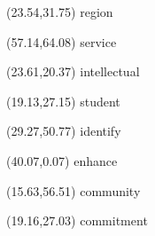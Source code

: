 \documentclass[11pt]{letter} %
\begin{document}
\begin{textblock}{0}(23.54,31.75) \small{region} \end{textblock}
\begin{textblock}{0}(57.14,64.08) \scriptsize{service} \end{textblock}
\begin{textblock}{0}(23.61,20.37) \tiny{intellectual} \end{textblock}
\begin{textblock}{0}(19.13,27.15) \Huge{student} \end{textblock}
\begin{textblock}{0}(29.27,50.77) \small{identify} \end{textblock}
\begin{textblock}{0}(40.07,0.07) \tiny{enhance} \end{textblock}
\begin{textblock}{0}(15.63,56.51) \Large{community} \end{textblock}
\begin{textblock}{0}(19.16,27.03) \large{commitment} \end{textblock}
\end{document}
